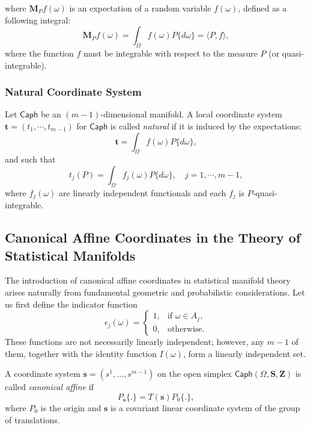 where $\mathbf{M}_Pf(\omega)$ is an expectation of a random variable $f(\omega)$, defined as a following integral:
\[
\mathbf{M}_P f(\omega)= \int_{\Omega} f(\omega)P\{d\omega\}= \langle P, f \rangle,
\]
where the function $f$ must be integrable with respect to the measure $P$ (or quasi-integrable).

\subsubsection*{Natural Coordinate System}
\begin{definition}
Let $\mathsf{Caph}$ be an $(m-1)$-dimensional manifold.
A local coordinate system $\mathbf{t}= (t_1,\cdots,t_{m-1})$ for $\mathsf{Caph}$ is called \emph{natural} if it is induced by the expectations:
    \[
    \mathbf{t} = \int_{\Omega} f(\omega)P\{d\omega\},
    \]
    and such that 
    \[
    t_j(P) =  \int_{\Omega} f_j(\omega)P\{d\omega\}, \quad j=1,\cdots, m-1,
    \]
  where $f_j(\omega)$ are linearly independent functionals and each $f_j$ is $P$-quasi-integrable.
\end{definition}


\subsection{Canonical Affine Coordinates in the Theory of Statistical Manifolds}

The introduction of canonical affine coordinates in statistical manifold theory arises naturally from fundamental geometric and probabilistic considerations. Let us first define the indicator function 
\[
\epsilon_j(\omega) = 
\begin{cases} 
1, & \text{if } \omega \in A_j, \\
0, & \text{otherwise}.
\end{cases}
\]
These functions are not necessarily linearly independent; however, any $m-1$ of them, together with the identity function $I(\omega)$, form a linearly independent set.

\begin{definition}
    A coordinate system $\mathbf{s}=(s^1,\dots,s^{m-1})$ on the open simplex $\mathsf{Caph}(\Omega, \mathbf{S}, \mathbf{Z})$ is called \emph{canonical affine} if
    \[
    P_{\mathbf{s}} \{ .\} = T(\mathbf{s}) P_0\{ .\},
    \]
    where $P_0$ is the origin and $\mathbf{s}$ is a covariant linear coordinate system of the group of translations.
\end{definition}

